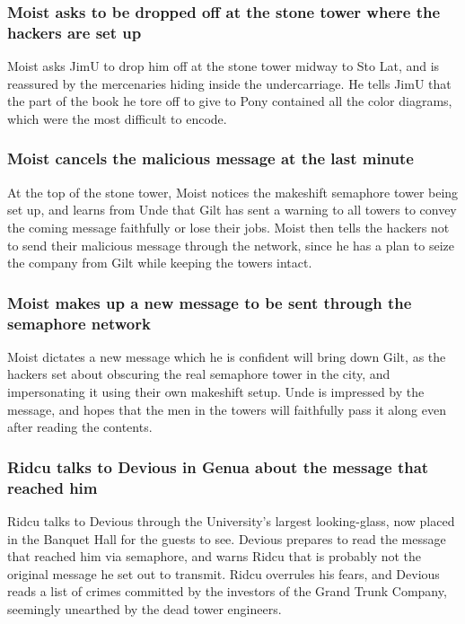 \subsubsection{\Gls{Moist} asks to be dropped off at the stone tower where the hackers are set up}
\Gls{Moist} asks \Gls{JimU} to drop him off at the stone tower midway to Sto Lat, and is reassured
by the mercenaries hiding inside the undercarriage. He tells \Gls{JimU} that the part of the book
he tore off to give to \Gls{Pony} contained all the color diagrams, which were the most difficult to
encode.

\subsubsection{\Gls{Moist} cancels the malicious message at the last minute}
At the top of the stone tower, \Gls{Moist} notices the makeshift semaphore tower being set up, and
learns from \Gls{Unde} that \Gls{Gilt} has sent a warning to all towers to convey the coming message
faithfully or lose their jobs. \Gls{Moist} then tells the hackers not to send their malicious
message through the network, since he has a plan to seize the company from \Gls{Gilt} while keeping
the towers intact.

\subsubsection{\Gls{Moist} makes up a new message to be sent through the semaphore network}
\Gls{Moist} dictates a new message which he is confident will bring down \Gls{Gilt}, as the hackers
set about obscuring the real semaphore tower in the city, and impersonating it using their own
makeshift setup. \Gls{Unde} is impressed by the message, and hopes that the men in the towers will
faithfully pass it along even after reading the contents.

\subsubsection{\Gls{Ridcu} talks to \Gls{Devious} in Genua about the message that reached him}
\Gls{Ridcu} talks to \Gls{Devious} through the University's largest looking-glass, now placed in
the Banquet Hall for the guests to see. \Gls{Devious} prepares to read the message that reached him
via semaphore, and warns \Gls{Ridcu} that is probably not the original message he set out to
transmit. \Gls{Ridcu} overrules his fears, and \Gls{Devious} reads a list of crimes committed by
the investors of the Grand Trunk Company, seemingly unearthed by the dead tower engineers.

